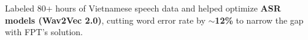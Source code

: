 
\vspace{1pt}
\begin{resume_list}
  \item Labeled 80+ hours of Vietnamese speech data and helped optimize \textbf{ASR models (Wav2Vec 2.0)}, cutting word error rate by \textbf{$\sim$12\%} to narrow the gap with FPT's solution.
\end{resume_list}
